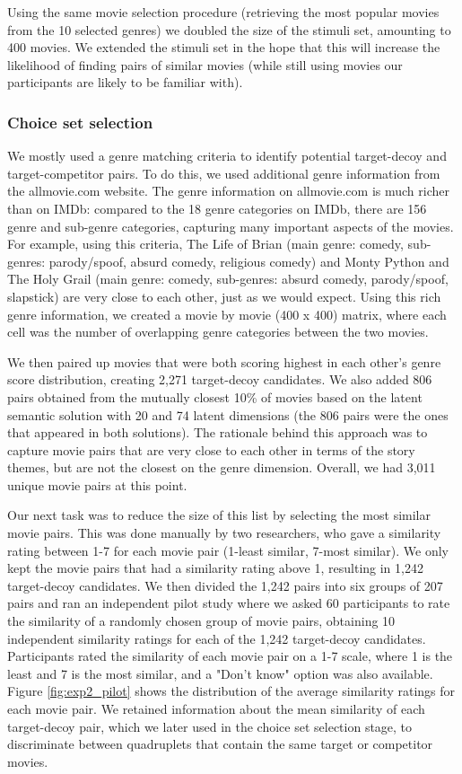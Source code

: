 \documentclass[11pt,a4paper]{article}
\begin{document}
Using the same movie selection procedure (retrieving the most popular movies from the 10 selected genres) we doubled the size of the stimuli set, amounting to 400 movies. We extended the stimuli set in the hope that this will increase the likelihood of finding pairs of similar movies (while still using movies our participants are likely to be familiar with). 

\subsubsection{Choice set selection}

We mostly used a genre matching criteria to identify potential target-decoy and target-competitor pairs. To do this, we used additional genre information from the allmovie.com website. The genre information on allmovie.com is much richer than on IMDb: compared to the 18 genre categories on IMDb, there are 156 genre and sub-genre categories, capturing many important aspects of the movies. For example, using this criteria, The Life of Brian (main genre: comedy, sub-genres: parody/spoof, absurd comedy, religious comedy) and Monty Python and The Holy Grail (main genre: comedy, sub-genres: absurd comedy, parody/spoof, slapstick) are very close to each other, just as we would expect. 
Using this rich genre information, we created a movie by movie (400 x 400) matrix, where each cell was the number of overlapping genre categories between the two movies. 

We then paired up movies that were both scoring highest in each other's genre score distribution, creating 2,271 target-decoy candidates. We also added 806 pairs obtained from the mutually closest 10\% of movies based on the latent semantic solution with 20 and 74 latent dimensions (the 806 pairs were the ones that appeared in both solutions). The rationale behind this approach was to capture movie pairs that are very close to each other in terms of the story themes, but are not the closest on the genre dimension. Overall, we had 3,011 unique movie pairs at this point. 

Our next task was to reduce the size of this list by selecting the most similar movie pairs. This was done manually by two researchers, who gave a similarity rating between 1-7 for each movie pair (1-least similar, 7-most similar). We only kept the movie pairs that had a similarity rating above 1, resulting in 1,242 target-decoy candidates. We then divided the 1,242 pairs into six groups of 207 pairs and ran an independent pilot study where we asked 60 participants to rate the similarity of a randomly chosen group of movie pairs, obtaining 10 independent similarity ratings for each of the 1,242 target-decoy candidates. Participants rated the similarity of each movie pair on a 1-7 scale, where 1 is the least and 7 is the most similar, and a "Don't know" option was also available. Figure \ref{fig:exp2_pilot}  shows the distribution of the average similarity ratings for each movie pair. We retained information about the mean similarity of each target-decoy pair, which we later used in the choice set selection stage, to discriminate between quadruplets that contain the same target or competitor movies. 
\end{document}
